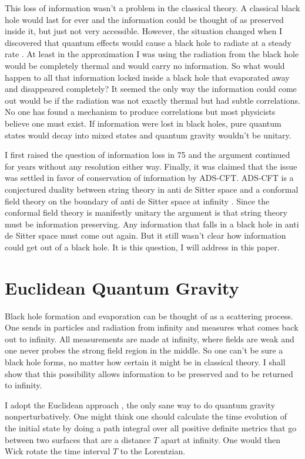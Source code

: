 \documentclass[aps,prd,groupedaddress,showpacs,12pt]{revtex4-1}
\begin{document}
This loss of information wasn't a problem in the classical theory. A classical black hole would last for ever and the information could be thought of as preserved inside it, but just not very accessible. However, the situation changed when I discovered that quantum effects would cause a black hole to radiate at a steady rate \cite{Stephen1}. At least in the approximation I was using the radiation from the black hole would be completely thermal and would carry no information\cite{Stephen2}. So what would happen to all that information locked inside a black hole that evaporated away and disappeared completely?  It seemed the only way the information could come out would be if the radiation was not exactly thermal but had subtle correlations. No one has found a mechanism to produce correlations but most physicists believe one must exist. If information were lost in black holes, pure quantum states would decay into mixed states and quantum gravity wouldn't be unitary.

I first raised the question of information loss in 75 and the argument continued for years without any resolution either way. Finally, it was claimed that the issue was settled in favor of conservation of information by ADS-CFT. 
ADS-CFT is a conjectured duality between string theory in anti de Sitter space and a conformal field theory on the boundary of anti de Sitter space at infinity \cite{ADSCFTreviews }. Since the conformal field theory is manifestly unitary the argument is that string theory must be information preserving. Any information that falls in a black hole in anti de Sitter space must come out again. But it still wasn't clear how information could get out of a black hole. It is this question, I will address in this paper. 

\section{Euclidean Quantum Gravity}


Black hole formation and evaporation can be thought of as a scattering process. One sends in particles and radiation from infinity and measures what comes back out to infinity. All measurements are made at infinity, where fields are weak and one never probes the strong field region in the middle. So one can't be sure a black hole forms, no matter how certain it might be in classical theory. I shall show that this possibility allows information to be preserved and to be returned to infinity. 

I adopt the Euclidean approach \cite{EQG}, the only sane way to do quantum gravity nonperturbatively. One might think one should calculate the time evolution of the initial state by doing a path integral over all positive definite metrics that go between two surfaces that are a distance $T$ apart at infinity. One would then Wick rotate the time interval $T$ to the Lorentzian. 
\end{document}
